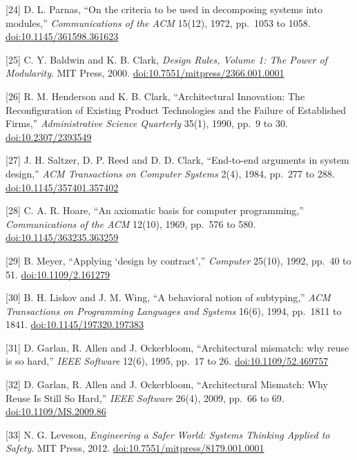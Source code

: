\documentclass[
  10pt,
]{article}
\begin{document}
{[}24{]} D. L. Parnas, ``On the criteria to be used in decomposing
systems into modules,'' \emph{Communications of the ACM} 15(12), 1972,
pp.~1053 to 1058.
\href{https://doi.org/10.1145/361598.361623}{doi:10.1145/361598.361623}

{[}25{]} C. Y. Baldwin and K. B. Clark, \emph{Design Rules, Volume 1:
The Power of Modularity}. MIT Press, 2000.
\href{https://doi.org/10.7551/mitpress/2366.001.0001}{doi:10.7551/mitpress/2366.001.0001}

{[}26{]} R. M. Henderson and K. B. Clark, ``Architectural Innovation:
The Reconfiguration of Existing Product Technologies and the Failure of
Established Firms,'' \emph{Administrative Science Quarterly} 35(1),
1990, pp.~9 to 30.
\href{https://doi.org/10.2307/2393549}{doi:10.2307/2393549}

{[}27{]} J. H. Saltzer, D. P. Reed and D. D. Clark, ``End-to-end
arguments in system design,'' \emph{ACM Transactions on Computer
Systems} 2(4), 1984, pp.~277 to 288.
\href{https://doi.org/10.1145/357401.357402}{doi:10.1145/357401.357402}

{[}28{]} C. A. R. Hoare, ``An axiomatic basis for computer
programming,'' \emph{Communications of the ACM} 12(10), 1969, pp.~576 to
580.
\href{https://doi.org/10.1145/363235.363259}{doi:10.1145/363235.363259}

{[}29{]} B. Meyer, ``Applying `design by contract','' \emph{Computer}
25(10), 1992, pp.~40 to 51.
\href{https://doi.org/10.1109/2.161279}{doi:10.1109/2.161279}

{[}30{]} B. H. Liskov and J. M. Wing, ``A behavioral notion of
subtyping,'' \emph{ACM Transactions on Programming Languages and
Systems} 16(6), 1994, pp.~1811 to 1841.
\href{https://doi.org/10.1145/197320.197383}{doi:10.1145/197320.197383}

{[}31{]} D. Garlan, R. Allen and J. Ockerbloom, ``Architectural
mismatch: why reuse is so hard,'' \emph{IEEE Software} 12(6), 1995,
pp.~17 to 26.
\href{https://doi.org/10.1109/52.469757}{doi:10.1109/52.469757}

{[}32{]} D. Garlan, R. Allen and J. Ockerbloom, ``Architectural
Mismatch: Why Reuse Is Still So Hard,'' \emph{IEEE Software} 26(4),
2009, pp.~66 to 69.
\href{https://doi.org/10.1109/MS.2009.86}{doi:10.1109/MS.2009.86}

{[}33{]} N. G. Leveson, \emph{Engineering a Safer World: Systems
Thinking Applied to Safety}. MIT Press, 2012.
\href{https://doi.org/10.7551/mitpress/8179.001.0001}{doi:10.7551/mitpress/8179.001.0001}
\end{document}
